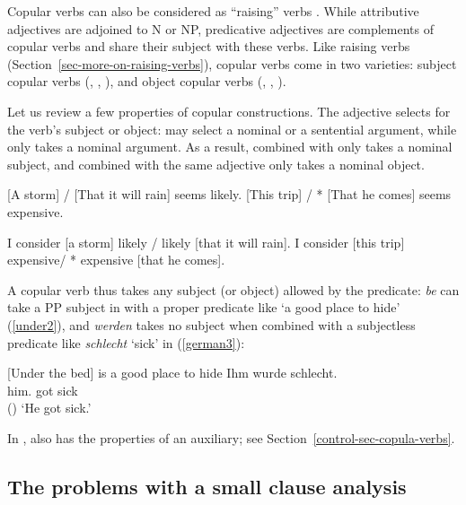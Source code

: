 \largerpage
Copular verbs can also be considered as ``raising'' verbs \citep[]{Chomsky81a}.  While
attributive adjectives are adjoined to N or NP, predicative adjectives are complements of copular
verbs and share their subject with these verbs. Like raising verbs
(Section~\ref{sec-more-on-raising-verbs}), copular verbs come in two varieties: subject copular
verbs (, , ), and object copular verbs (,
, ).

Let us review a few properties of copular constructions.
The adjective selects for the verb's subject or object:  may select a nominal or a
sentential argument, while  only takes a nominal argument. As a result, 
combined with  only takes a nominal subject, and  combined with the
same adjective only takes a nominal object. 


\begin{exe}
\ex \label{storm}
\begin{xlist}
\ex{} [A storm] / [That it will rain] seems likely.
\ex{} [This trip] / * [That he comes] seems expensive.
\end{xlist}
\ex \begin{xlist}
\ex 	I consider [a storm] likely / likely [that it will rain].
\ex 	I consider [this trip] expensive/ * expensive [that he comes].
\end{xlist}	
\end{exe}


A copular verb thus takes any subject (or object) allowed by the predicate: \emph{be} can take a PP
subject in  with a proper predicate like `a good place to hide' (\ref{under2}), and \emph{werden} takes no subject when combined with a
subjectless predicate like \emph{schlecht} `sick' in  (\ref{german3}):

\eal
\ex{}[Under the bed] is a good place to hide \label{under2}
\ex
\label{german3} 
\gll Ihm        wurde schlecht.\footnotemark\\
     him.\DAT{} got   sick\\\hfill()
\glt `He got sick.'
\zl

\noindent
In ,  also has the properties of an auxiliary; see Section~\ref{control-sec-copula-verbs}.

\subsection{The problems with a small clause analysis}

